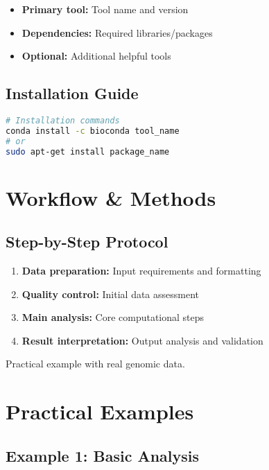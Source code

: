 \documentclass[a4paper,11pt]{article}
\begin{document}
\begin{itemize}
    \item \textbf{Primary tool:} Tool name and version
    \item \textbf{Dependencies:} Required libraries/packages
    \item \textbf{Optional:} Additional helpful tools
\end{itemize}

\subsection{Installation Guide}
\begin{lstlisting}[language=bash, caption=Software installation]
# Installation commands
conda install -c bioconda tool_name
# or
sudo apt-get install package_name
\end{lstlisting}

\section{Workflow \& Methods}

\subsection{Step-by-Step Protocol}

\begin{enumerate}
    \item \textbf{Data preparation:} Input requirements and formatting
    \item \textbf{Quality control:} Initial data assessment
    \item \textbf{Main analysis:} Core computational steps
    \item \textbf{Result interpretation:} Output analysis and validation
\end{enumerate}

\begin{example}
Practical example with real genomic data.
\end{example}

\section{Practical Examples}

\subsection{Example 1: Basic Analysis}
\end{document}
